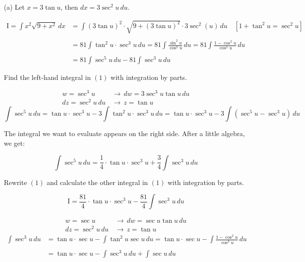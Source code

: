 \documentclass{article}
\begin{document}
\hfill

\noindent (a) Let $x= 3\tan u$, then $dx=3\sec^2u \,du$.

\begin{align}
\mathrm{I} = \int x^2\sqrt{9+x^2} \, dx &= \int (3\tan u)^2 \cdot\sqrt{9+(3\tan u)^2} \cdot3\sec^2(u)\,du \quad [1+ \tan^2u = \sec^2u] \nonumber\\\nonumber\\&=81\int\tan^2u \cdot \sec^3u \,du = 81\int \frac{\sin^2u}{\cos ^5 u}\, du = 81\int \frac{1-\cos^2u}{\cos^5u}\,du\nonumber\\\nonumber\\&=81\int\sec^5u\, du - 81\int \sec^3u\,du
\end{align}

\hfill

\noindent Find the left-hand integral in $(1)$ with integration by parts.

\begin{align*}
    w=\sec^3 u\,&\rightarrow\, dw = 3\sec^3u\tan u \,du\\
    dz=\sec^2u\,du\,&\rightarrow\, z = \tan u
\end{align*}
\[
\int\sec^5u \,du =\tan u \cdot \sec^3 u -3\int \tan^2u\cdot \sec^3 u\,du  = \tan u \cdot \sec^3 u - 3\int(\sec^5u- \sec^3u)\,du
\]

\hfill

\noindent The integral we want to evaluate appears on the right side. After a little algebra, we get:

\[\int\sec^5u \,du = \frac 14\cdot\tan u\cdot\sec^3 u + \frac 34\int\sec^3u\,du\]

\hfill

\noindent Rewrite $(1)$ and calculate the other integral in $(1)$ with integration by parts.

\begin{equation}
\mathrm{I} = \frac{81}4\cdot\tan u\cdot\sec^3 u - \frac {81}4\int\sec^3u\,du
\end{equation}

\begin{align*}
    w=\sec u\,&\rightarrow\, dw = \sec u\tan u \,du\\
    dz=\sec^2u\,du\,&\rightarrow\, z = \tan u
\end{align*}
\begin{align*}
\int\sec^3u\,du&=\tan u \cdot \sec u -\int \tan^2 u\sec u\, du = \tan u \cdot \sec u -\int \frac{1-\cos^2u}{\cos^3 u}\, du\\\\&= \tan u \cdot \sec u - \int \sec^3u \, du + \int \sec u \, du 
\end{align*}
\end{document}
